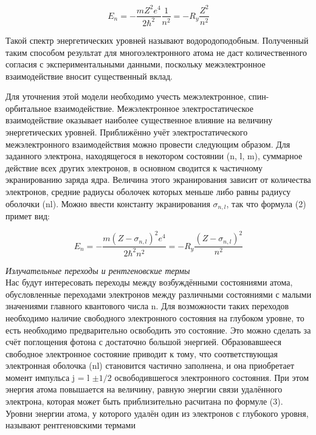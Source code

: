 \documentclass[a4paper, 12pt]{article}%
\begin{document}
	\begin{equation}
		E_n=-\frac{m Z^2 e^4}{2 \hbar^2} \frac{1}{n^2}=-R_y \frac{Z^2}{n^2}
	\end{equation}
	
	Такой спектр энергетических уровней называют водородоподобным. Полученный таким
	способом результат для многоэлектронного атома не даст количественного согласия с экспериментальными данными, поскольку межэлектронное
	взаимодействие вносит существенный вклад.
	
	Для уточнения этой модели необходимо учесть межэлектронное, спин-орбитальное взаимодействие. Межэлектронное электростатическое взаимодействие оказывает наиболее существенное влияние
	на величину энергетических уровней.
	Приближённо учёт электростатического межэлектронного взаимодействия можно провести следующим образом. Для заданного электрона,
	находящегося в некотором состоянии (n, l, m), суммарное действие всех
	других электронов, в основном сводится к частичному экранированию
	заряда ядра. Величина этого экранирования зависит от количества электронов, средние радиусы оболочек которых меньше либо равны радиусу оболочки (nl). Можно ввести константу экранирования $\sigma_{n, l}$, так что
	формула (2) примет вид:
	
	\begin{equation}
		E_n=-\frac{m (Z - \sigma_{n, l})^2 e^4}{2 \hbar^2 n^2}=-R_y \frac{(Z - \sigma_{n, l})^2}{n^2}
	\end{equation}

	\addvspace{20pt}

	\textit{Излучательные переходы и рентгеновские термы}\\
	
	Нас будут интересовать переходы между возбуждёнными состояниями атома, обусловленные переходами электронов между различными состояниями с малыми значениями главного квантового
	числа n. Для возможности таких переходов необходимо наличие свободного электронного состояния на глубоком уровне, то есть необходимо
	предварительно освободить это состояние. Это
	можно сделать за счёт поглощения фотона с достаточно большой энергией. Образовавшееся свободное электронное состояние приводит к тому,
	что соответствующая электронная оболочка (nl) становится частично заполнена, и она приобретает момент импульса j = l $\pm 1/2$
	освободившегося
	электронного состояния. При этом энергия атома повышается на величину, равную энергии связи удалённого электрона, которая может быть
	приблизительно расчитана по формуле (3). Уровни энергии атома, у
	которого удалён один из электронов с глубокого уровня, называют рентгеновскими термами
	
\end{document}
